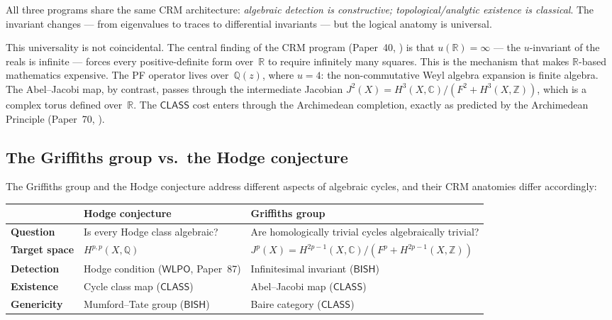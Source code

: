 \documentclass[11pt]{article}
\theoremstyle{plain}
\theoremstyle{definition}
\theoremstyle{remark}
\newcommand{\Z}{\mathbb{Z}}
\newcommand{\Q}{\mathbb{Q}}
\newcommand{\R}{\mathbb{R}}
\newcommand{\C}{\mathbb{C}}
\newcommand{\BISH}{\ensuremath{\mathsf{BISH}}}
\newcommand{\WLPO}{\ensuremath{\mathsf{WLPO}}}
\newcommand{\CLASS}{\ensuremath{\mathsf{CLASS}}}
\begin{document}
All three programs share the same CRM architecture: \emph{algebraic detection is constructive; topological/analytic existence is classical}. The invariant changes --- from eigenvalues to traces to differential invariants --- but the logical anatomy is universal.

This universality is not coincidental. The central finding of the CRM program (Paper~40, \cite{paper40}) is that $u(\R) = \infty$ --- the $u$-invariant of the reals is infinite --- forces every positive-definite form over~$\R$ to require infinitely many squares. This is the mechanism that makes $\R$-based mathematics expensive. The PF operator lives over~$\Q(z)$, where $u = 4$: the non-commutative Weyl algebra expansion is finite algebra. The Abel--Jacobi map, by contrast, passes through the intermediate Jacobian $J^2(X) = H^3(X,\C)/(F^2 + H^3(X,\Z))$, which is a complex torus defined over~$\R$. The $\CLASS$ cost enters through the Archimedean completion, exactly as predicted by the Archimedean Principle (Paper~70, \cite{paper40}).

\subsection{The Griffiths group vs.\ the Hodge conjecture}

The Griffiths group and the Hodge conjecture address different aspects of algebraic cycles, and their CRM anatomies differ accordingly:

\begin{center}
\renewcommand{\arraystretch}{1.2}
\begin{tabular}{@{}p{3.5cm}p{5cm}p{5cm}@{}}
\toprule
& \textbf{Hodge conjecture} & \textbf{Griffiths group} \\
\midrule
\textbf{Question} & Is every Hodge class algebraic? & Are homologically trivial cycles algebraically trivial? \\
\textbf{Target space} & $H^{p,p}(X,\Q)$ & $J^p(X) = H^{2p-1}(X,\C)/(F^p + H^{2p-1}(X,\Z))$ \\
\textbf{Detection} & Hodge condition ($\WLPO$, Paper~87) & Infinitesimal invariant ($\BISH$) \\
\textbf{Existence} & Cycle class map ($\CLASS$) & Abel--Jacobi map ($\CLASS$) \\
\textbf{Genericity} & Mumford--Tate group ($\BISH$) & Baire category ($\CLASS$) \\
\bottomrule
\end{tabular}
\end{center}
\end{document}
